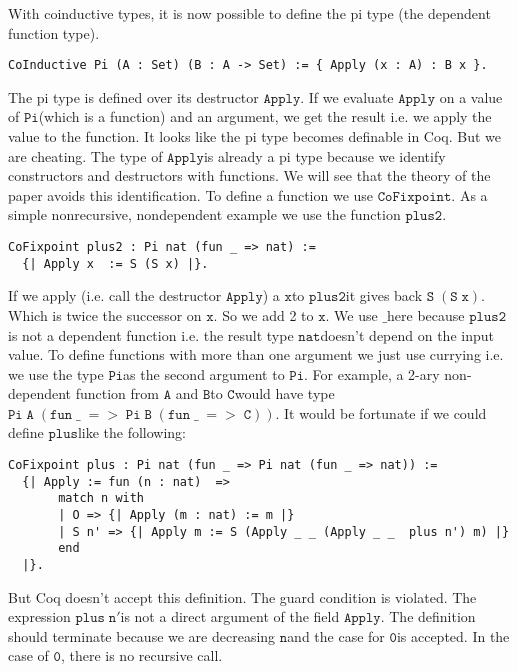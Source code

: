 \documentclass[a4paper,cleardoubleempty,BCOR1cm]{scrbook}
\begin{document}
With coinductive types, it is now possible to define the pi type (the dependent
function type).

\begin{verbatim}
CoInductive Pi (A : Set) (B : A -> Set) := { Apply (x : A) : B x }.
\end{verbatim}

The pi type is defined over its destructor $\mathtt{Apply}$.  If we evaluate $\mathtt{Apply}$
on a value of $\mathtt{Pi}$\;(which is a function) and an argument, we get the result
i.e. we apply the value to the function.  It looks like the pi type becomes definable
in Coq.  But we are cheating.  The type of $\mathtt{Apply}$\;is already a pi type because
we identify constructors and destructors with functions.  We will see that the theory of
the paper avoids this identification. To define a function we use
$\mathtt{CoFixpoint}$.  As a simple nonrecursive, nondependent example we use the
function $\mathtt{plus2}$.

\begin{verbatim}
CoFixpoint plus2 : Pi nat (fun _ => nat) :=
  {| Apply x  := S (S x) |}.
\end{verbatim}

If we apply (i.e. call the destructor $\mathtt{Apply}$) a $\mathtt{x}$\;to $\mathtt{plus2}$\;it gives back
$\mathtt{S\;(S\;x)}$.  Which is twice the successor on $\mathtt{x}$.  So we add 2 to $\mathtt{x}$.  We
use $\mathtt{\_}$\;here because $\mathtt{plus2}$\;is not a dependent function i.e. the result
type $\mathtt{nat}$\;doesn't depend on the input value.  To define functions with more
than one argument we just use currying i.e. we use the type $\mathtt{Pi}$\;as the
second argument to $\mathtt{Pi}$. For example, a 2-ary non-dependent function from $\mathtt{A}$
and $\mathtt{B}$\;to $\mathtt{C}$\;would have type $\mathtt{Pi\;A\;(fun\;\_\;=>\;Pi\;B\;(fun\;\_\;=>\;C))}$.  It
would be fortunate if we could define $\mathtt{plus}$\;like the following:

\begin{verbatim}
CoFixpoint plus : Pi nat (fun _ => Pi nat (fun _ => nat)) :=
  {| Apply := fun (n : nat)  =>
       match n with
       | O => {| Apply (m : nat) := m |}
       | S n' => {| Apply m := S (Apply _ _ (Apply _ _  plus n') m) |}
       end
  |}.
\end{verbatim}

But Coq doesn't accept this definition. The guard condition is violated. The
expression $\mathtt{plus\;n'}$\;is not a direct argument of the field $\mathtt{Apply}$. The
definition should terminate because we are decreasing $\mathtt{n}$\;and the case for
$\mathtt{0}$\;is accepted. In the case of $\mathtt{0}$, there is no recursive call.
\end{document}
